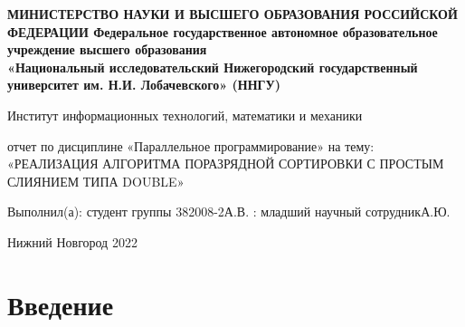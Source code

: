 \documentclass[12pt,a4paper]{article}
\title{}
\author{}
\date{}
\begin{document}
\begin{titlepage}
    \newpage
    \begin{center}
    {\bfseries МИНИСТЕРСТВО НАУКИ И ВЫСШЕГО ОБРАЗОВАНИЯ РОССИЙСКОЙ ФЕДЕРАЦИИ
Федеральное государственное автономное образовательное учреждение
высшего образования
 \\
    «Национальный исследовательский
Нижегородский государственный университет им. Н.И. Лобачевского»
(ННГУ)
}

     Институт информационных технологий, математики и механики \\
    \end{center}

    \vspace{1.2em}

    \begin{center}
    \Large отчет \linebreak по дисциплине «Параллельное программирование» \linebreak на тему: \linebreak
«РЕАЛИЗАЦИЯ АЛГОРИТМА ПОРАЗРЯДНОЙ СОРТИРОВКИ С ПРОСТЫМ СЛИЯНИЕМ ТИПА DOUBLE»

    \end{center}

    \vspace{5em}


    \begin{flushright}
                       Выполнил(а):
                       студент группы 382008-2 А.В.\underline{\hspace{3cm}} \linebreak{}: младший научный сотрудник А.Ю.\underline{\hspace{3cm}} 
    \end{flushright}


    \vspace{\fill}

    \begin{center}
    Нижний Новгород 2022
    \end{center}

    \end{titlepage}
    
\maketitle

\part*{Введение}
\end{document}
